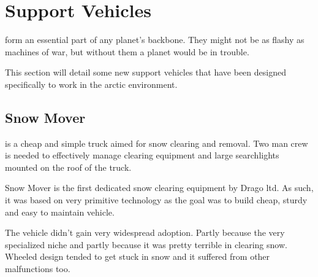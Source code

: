 \documentclass{tufte-book}
\begin{document}
\chapter{Support Vehicles}
\label{ch:support-vehicles}


 form an essential part of any planet's
backbone. They might not be as flashy as machines of war, but without
them a planet would be in trouble.

This section will detail some new support vehicles that have been
designed specifically to work in the arctic environment.



\section{Snow Mover}
 is a cheap and simple truck aimed for snow clearing and
removal. Two man crew is needed to effectively manage clearing equipment
and large searchlights mounted on the roof of the truck.

Snow Mover is the first dedicated snow clearing equipment by Drago ltd. As
such, it was based on very primitive technology as the goal was to build
cheap, sturdy and easy to maintain vehicle.

The vehicle didn't gain very widespread adoption. Partly because the very
specialized niche and partly because it was pretty terrible in clearing
snow. Wheeled design tended to get stuck in snow and it suffered from
other malfunctions too.
\end{document}
